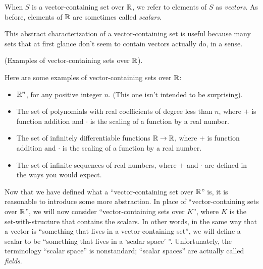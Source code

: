 \begin{defn}
    When $S$ is a vector-containing set over $\mathbb{R}$, we refer to elements of $S$ as \textit{vectors}. As before, elements of $\mathbb{R}$ are sometimes called \textit{scalars}.
\end{defn}

This abstract characterization of a vector-containing set is useful because many sets that at first glance don't seem to contain vectors actually do, in a sense.

\begin{remark}
    (Examples of vector-containing sets over $\mathbb{R}$).
    
    Here are some examples of vector-containing sets over $\mathbb{R}$:
    
    \begin{itemize}
        \item $\mathbb{R}^n$, for any positive integer $n$. (This one isn't intended to be surprising).
        \item The set of polynomials with real coefficients of degree less than $n$, where $+$ is function addition and $\cdot$ is the scaling of a function by a real number.
        \item The set of infinitely differentiable functions $\mathbb{R} \rightarrow \mathbb{R}$, where $+$ is function addition and $\cdot$ is the scaling of a function by a real number.
        \item The set of infinite sequences of real numbers, where $+$ and $\cdot$ are defined in the ways you would expect.
    \end{itemize}
\end{remark}

Now that we have defined what a ``vector-containing set over $\mathbb{R}$'' is, it is reasonable to introduce some more abstraction. In place of ``vector-containing sets over $\mathbb{R}$'', we will now consider ``vector-containing sets over $K$'', where $K$ is the set-with-structure that contains the scalars. In other words, in the same way that a vector is ``something that lives in a vector-containing set'', we will define a scalar to be ``something that lives in a `scalar space' ''.  Unfortunately, the terminology ``scalar space'' is nonstandard;  ``scalar spaces'' are actually called \textit{fields}.

\newpage

